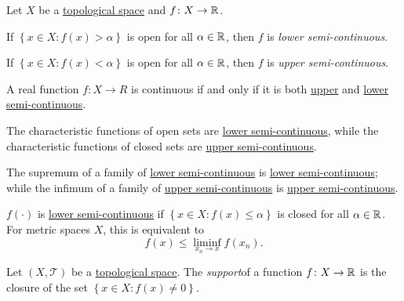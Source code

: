 \begin{definition*}
	Let \(X\) be a \hyperref[def:topological-space]{topological space} and \(f\colon X \to \mathbb{\MakeUppercase{r}} \).
	\begin{definition}\label{def:lower-semi-continuous}
		If \(\left\{ x\in X\colon f(x) > \alpha  \right\} \) is open for all \(\alpha \in \mathbb{\MakeUppercase{r}} \), then \(f\) is \emph{lower semi-continuous}.
	\end{definition}
	\begin{definition}\label{def:upper-semi-continuous}
		If \(\left\{ x\in X\colon f(x) < \alpha  \right\} \) is open for all \(\alpha \in \mathbb{\MakeUppercase{r}} \), then \(f\) is \emph{upper semi-continuous}.
	\end{definition}
\end{definition*}

\begin{remark}
	A real function \(f\colon X \to R\) is continuous if and only if it is both \hyperref[def:upper-semi-continuous]{upper} and \hyperref[def:lower-semi-continuous]{lower semi-continuous}.
\end{remark}

\begin{remark}
	The characteristic functions of open sets are \hyperref[def:lower-semi-continuous]{lower semi-continuous}, while the characteristic functions of closed sets are \hyperref[def:upper-semi-continuous]{upper semi-continuous}.
\end{remark}

\begin{remark}
	The supremum of a family of \hyperref[def:lower-semi-continuous]{lower semi-continuous} is \hyperref[def:lower-semi-continuous]{lower semi-continuous}; while the infimum of a family of \hyperref[def:upper-semi-continuous]{upper semi-continuous} is \hyperref[def:upper-semi-continuous]{upper semi-continuous}.
\end{remark}

\begin{remark}
	\(f(\cdot)\) is \hyperref[def:lower-semi-continuous]{lower semi-continuous} if \(\left\{ x\in X\colon f(x) \leq \alpha \right\} \) is closed for all \(\alpha \in \mathbb{\MakeUppercase{r}} \). For metric spaces \(X\), this is equivalent to
	\[
		f(x) \leq \liminf_{x_n \to x} f(x_n).
	\]
\end{remark}

\begin{definition}[Support]\label{def:support}
	Let \((X, \mathcal{T} )\) be a \hyperref[def:topological-space]{topological space}. The \emph{support}of a function \(f\colon X \to \mathbb{\MakeUppercase{r}} \) is the closure of the set \(\left\{ x\in X\colon f(x) \neq 0 \right\}\).
\end{definition}

